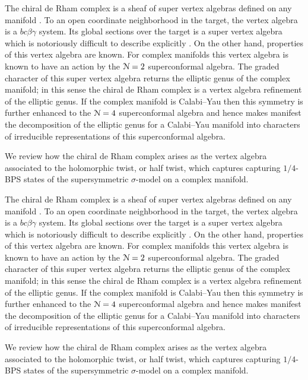 \documentclass[../main.tex]{subfiles}
\begin{document}
The chiral de Rham complex is a sheaf of super vertex algebras defined on any manifold \cite{Malikovetal}.
To an open coordinate neighborhood in the target, the vertex algebra is a $bc\beta\gamma$ system.
Its global sections over the target is a super vertex algebra which is notoriously difficult to describe explicitly \cite{Moonshine stuff?}.
On the other hand, properties of this vertex algebra are known.
For complex manifolds this vertex algebra is known to have an action by the $\mathcal{N}=2$ superconformal algebra.
The graded character of this super vertex algebra returns the elliptic genus of the complex manifold; in this sense the chiral de Rham complex is a vertex algebra refinement of the elliptic genus.
If the complex manifold is Calabi--Yau then this symmetry is further enhanced to the $\mathcal{N}=4$ superconformal algebra and hence makes manifest the decomposition of the elliptic genus for a Calabi--Yau manifold into characters of irreducible representations of this superconformal algebra.


We review how the chiral de Rham complex arises as the vertex algebra associated to the holomorphic twist, or half twist, which captures capturing $1/4$-BPS states of the supersymmetric $\sigma$-model on a complex manifold.

The chiral de Rham complex is a sheaf of super vertex algebras defined on any manifold \cite{MSV,??}.
To an open coordinate neighborhood in the target, the vertex algebra is a $bc\beta\gamma$ system.
Its global sections over the target is a super vertex algebra which is notoriously difficult to describe explicitly \cite{Moonshine stuff?}.
On the other hand, properties of this vertex algebra are known.
For complex manifolds this vertex algebra is known to have an action by the $\mathcal{N}=2$ superconformal algebra.
The graded character of this super vertex algebra returns the elliptic genus of the complex manifold; in this sense the chiral de Rham complex is a vertex algebra refinement of the elliptic genus.
If the complex manifold is Calabi--Yau then this symmetry is further enhanced to the $\mathcal{N}=4$ superconformal algebra and hence makes manifest the decomposition of the elliptic genus for a Calabi--Yau manifold into characters of irreducible representations of this superconformal algebra.


We review how the chiral de Rham complex arises as the vertex algebra associated to the holomorphic twist, or half twist, which captures capturing $1/4$-BPS states of the supersymmetric $\sigma$-model on a complex manifold.
\end{document}
